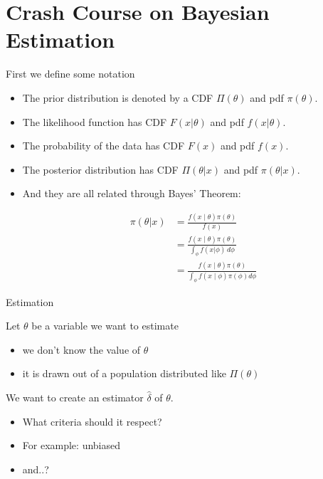 \documentclass[11pt]{beamer}
\begin{document}
\section{Crash Course on Bayesian Estimation}
\begin{frame}{First we define some notation}

\begin{itemize}

\item The prior distribution is denoted by a CDF $\Pi(\theta)$ and pdf $\pi(\theta)$. 

\item The likelihood function has CDF $F(x|\theta)$ and pdf $f(x|\theta)$. 

\item The probability of the data has CDF $F(x)$ and pdf $f(x)$.

\item The posterior distribution has CDF $\Pi(\theta|x)$ and pdf $\pi(\theta|x)$. 

\item And they are all related through Bayes' Theorem: 

\begin{align*}
\pi(\theta | x)&=\frac {f(x\mid \theta )\pi(\theta )}{f(x)}\\
&=\frac {f(x\mid \theta )\pi(\theta )}{\int _{\phi}f(x|\phi)\,d\phi}\\
&=\frac {f(x\mid \theta )\pi(\theta )}{\int _{\phi}f(x\mid \phi)\pi(\phi) d\phi}
\end{align*}



\end{itemize}

\end{frame}
\begin{frame}{Estimation}

Let $\theta$ be a variable we want to estimate
\begin{itemize}
\item we don't know the value of $\theta$
\item it is drawn out of a population distributed like $\Pi(\theta)$
\end{itemize}

\vfill

We want to create an estimator $\hat{\delta}$ of $\theta$.
\begin{itemize}
\item \alert{What criteria should it respect?}
\item For example: unbiased
\item and..?
\end{itemize}

\end{frame}
\end{document}
